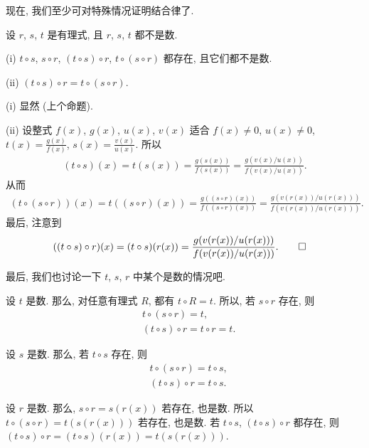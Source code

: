现在, 我们至少可对特殊情况证明结合律了.

\begin{proposition}
    设 $r$, $s$, $t$ 是有理式, 且 $r$, $s$, $t$ 都不是数.

    (i) $t \circ s$, $s \circ r$, $(t \circ s) \circ r$, $t \circ (s \circ r)$ 都存在, 且它们都不是数.

    (ii) $(t \circ s) \circ r = t \circ (s \circ r)$.
\end{proposition}

\begin{pf}
    (i) 显然 (上个命题).

    (ii) 设整式 $f(x)$, $g(x)$, $u(x)$, $v(x)$ 适合 $f(x) \neq 0$, $u(x) \neq 0$, $t(x) = \frac{g(x)}{f(x)}$, $s(x) = \frac{v(x)}{u(x)}$. 所以
    \begin{align*}
        (t \circ s)(x) = t(s(x)) = \frac{g(s(x))}{f(s(x))} = \frac{g(v(x)/u(x))}{f(v(x)/u(x))}.
    \end{align*}
    从而
    \begin{align*}
        (t \circ (s \circ r))(x) = t((s \circ r)(x)) = \frac{g((s \circ r)(x))}{f((s \circ r)(x))} = \frac{g(v(r(x))/u(r(x)))}{f(v(r(x))/u(r(x)))}.
    \end{align*}
    最后, 注意到
    \begin{align*}
         & ((t \circ s) \circ r)(x) = (t \circ s)(r(x)) = \frac{g(v(r(x))/u(r(x)))}{f(v(r(x))/u(r(x)))}. \qedhere
    \end{align*}
\end{pf}

最后, 我们也讨论一下 $t$, $s$, $r$ 中某个是数的情况吧.

设 $t$ 是数. 那么, 对任意有理式 $R$, 都有 $t \circ R = t$. 所以, 若 $s \circ r$ 存在, 则
\begin{align*}
     & t \circ (s \circ r) = t,             \\
     & (t \circ s) \circ r = t \circ r = t.
\end{align*}

设 $s$ 是数. 那么, 若 $t \circ s$ 存在, 则
\begin{align*}
     & t \circ (s \circ r) = t \circ s, \\
     & (t \circ s) \circ r = t \circ s.
\end{align*}

设 $r$ 是数. 那么, $s \circ r = s(r(x))$ 若存在, 也是数. 所以 $t \circ (s \circ r) = t(s(r(x)))$ 若存在, 也是数. 若 $t \circ s$, $(t \circ s) \circ r$ 都存在, 则 $(t \circ s) \circ r = (t \circ s)(r(x)) = t(s(r(x)))$.

